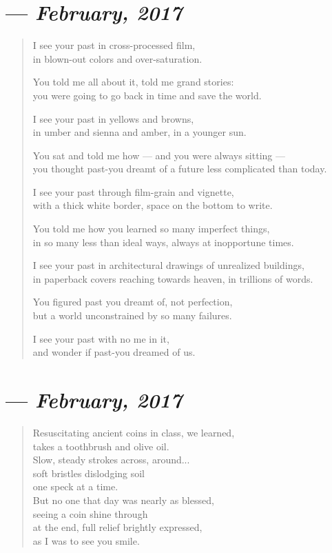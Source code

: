 \section{--- \textit{February, 2017}}

\begin{verse}
  I see your past in cross-processed film,\\
  in blown-out colors and over-saturation.

  \vin You told me all about it, told me grand stories:\\
  \vin you were going to go back in time and save the world.

  I see your past in yellows and browns,\\
  in umber and sienna and amber, in a younger sun.

  \vin You sat and told me how --- and you were always sitting ---\\
  \vin you thought past-you dreamt of a future less complicated than today.

  I see your past through film-grain and vignette,\\
  with a thick white border, space on the bottom to write.

  \vin You told me how you learned so many imperfect things,\\
  \vin in so many less than ideal ways, always at inopportune times.

  I see your past in architectural drawings of unrealized buildings,\\
  in paperback covers reaching towards heaven, in trillions of words.

  \vin You figured past you dreamt of, not perfection,\\
  \vin but a world unconstrained by so many failures.

  I see your past with no me in it,\\
  and wonder if past-you dreamed of us.
\end{verse}
\newpage

\section{--- \textit{February, 2017}}

\begin{verse}
  Resuscitating ancient coins in class, we learned,\\
  takes a toothbrush and olive oil.\\
  Slow, steady strokes across, around...\\
  soft bristles dislodging soil\\
  one speck at a time.\\
  But no one that day was nearly as blessed,\\
  seeing a coin shine through\\
  at the end, full relief brightly expressed,\\
  as I was to see you smile.
\end{verse}
\newpage


